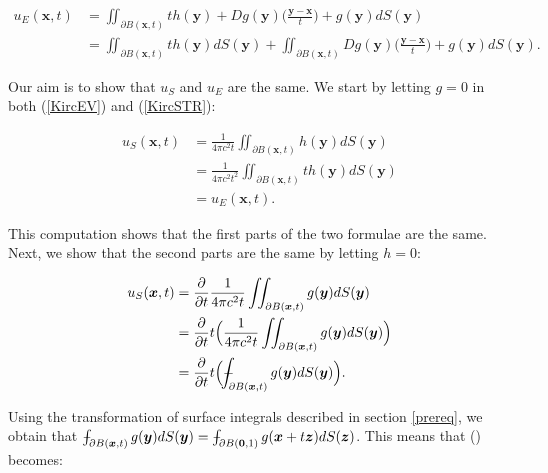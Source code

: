 \documentclass[a4paper, 12pt]{article}
\def\Xint#1{\mathchoice
{\XXint\displaystyle\textstyle{#1}}%
{\XXint\textstyle\scriptstyle{#1}}%
{\XXint\scriptstyle\scriptscriptstyle{#1}}%
{\XXint\scriptscriptstyle\scriptscriptstyle{#1}}%
\!\int}
\def\XXint#1#2#3{{\setbox0=\hbox{$#1{#2#3}{\int}$ }
\vcenter{\hbox{$#2#3$ }}\kern-.6\wd0}}
\def\dashint{\Xint-}
\numberwithin{equation}{section}
\begin{document}
\begin{equation*}
    \begin{aligned}
    u_E(\boldsymbol{x},t)&=\iint_{\partial B(\boldsymbol{x},t)} th(\boldsymbol{y})+Dg(\boldsymbol{y})\Big(\frac{\boldsymbol{y}-\boldsymbol{x}}{t}\Big)+g(\boldsymbol{y})dS(\boldsymbol{y})\\ 
    &=\iint_{\partial B(\boldsymbol{x},t)} th(\boldsymbol{y})dS(\boldsymbol{y})+\iint_{\partial B(\boldsymbol{x},t)} Dg(\boldsymbol{y})\Big(\frac{\boldsymbol{y}-\boldsymbol{x}}{t}\Big)+g(\boldsymbol{y})dS(\boldsymbol{y}).
    \end{aligned}
\end{equation*}

Our aim is to show that $u_S$ and $u_E$ are the same. We start by letting $g=0$ in both (\ref{KircEV}) and (\ref{KircSTR}):

\begin{equation} \label{g=0}
    \begin{aligned}
        u_S(\boldsymbol{x}, t)&=\frac{1}{4\pi c^2 t}\iint_{\partial B(\boldsymbol{x}, t)}h(\boldsymbol{y})dS(\boldsymbol{y})\\
        &=\frac{1}{4\pi c^2 t^2}\iint_{\partial B(\boldsymbol{x}, t)}th(\boldsymbol{y})dS(\boldsymbol{y})\\
        &=u_E(\boldsymbol{x}, t).
    \end{aligned}
\end{equation}

This computation shows that the first parts of the two formulae are the same. Next, we show that the second parts are the same by letting $h=0$:

\begin{equation} \label{starr}
    \begin{aligned}
        u_S(\boldsymbol{x},t)&=\diffp[1]{}{t}\frac{1}{4\pi c^2 t}\iint_{\partial B(\boldsymbol{x}, t)}g(\boldsymbol{y})dS(\boldsymbol{y})\\
        &=\diffp[1]{}{t}t\Big(\frac{1}{4\pi c^2 t}\iint_{\partial B(\boldsymbol{x}, t)}g(\boldsymbol{y})dS(\boldsymbol{y})\Big)\\
        &=\diffp[1]{}{t}t\Big(\dashint_{\partial B(\boldsymbol{x}, t)}g(\boldsymbol{y})dS(\boldsymbol{y})\Big).
    \end{aligned}
\end{equation}

Using the transformation of surface integrals described in section \ref{prereq}, we obtain that $\dashint_{\partial B(\boldsymbol{x}, t)}g(\boldsymbol{y})dS(\boldsymbol{y})=\dashint_{\partial B(\boldsymbol{0}, 1)}g(\boldsymbol{x}+t\boldsymbol{z})dS(\boldsymbol{z})$. 
This means that (\label{starr}) becomes:
 
\end{document}
